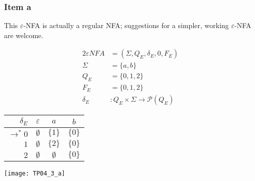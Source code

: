 {\subsubsection{Item a}
This $\varepsilon$-NFA is actually a regular NFA; suggestions for a simpler, working $\varepsilon$-NFA are welcome.
\begin{center}
	\begin{minipage}[c]{0.30\textwidth}
		\begin{alignat*}{2}
			\varepsilon NFA &= (\Sigma, Q_E, \delta_E, 0, F_E)\\
			\Sigma &= \{a,b\}\\
			Q_E    &= \{0,1,2\}\\
			F_E    &= \{0,1,2\}\\
			\delta_E &\colon Q_E \times \Sigma \rightarrow \mathscr{P}(Q_E)
		\end{alignat*}
	\end{minipage}
	\begin{minipage}[c]{0.25\textwidth}
		\begin{center}
		\begin{tabular}{ r | c c c }
 			$\delta_E          $ & $\varepsilon$ & $a    $ & $b    $ \\ \hline
 			$\rightarrow^* 0$ & $\emptyset$ & $\{1\}$ & $\{0\}$ \\  
 			$                 1$ & $\emptyset$ & $\{2\}$ & $\{0\}$ \\
 			$                 2$ & $\emptyset$ & $\emptyset$ & $\{0\}$
		\end{tabular}
		\end{center}
	\end{minipage}
	\begin{minipage}[c]{0.35\textwidth}
		\begin{center} \texttt{[image: TP04\_3\_a]} \end{center}
	\end{minipage}
\end{center}
}
